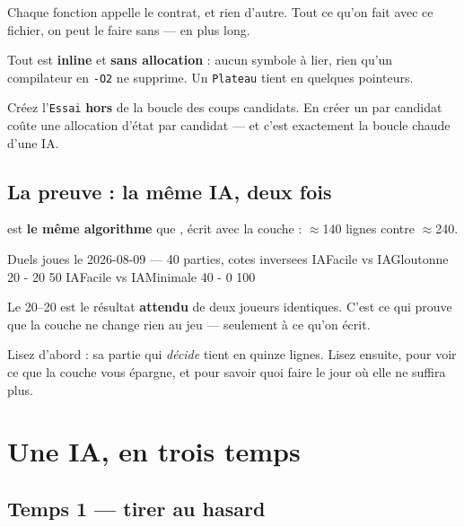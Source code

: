 \begin{nkretenir}
Chaque fonction appelle le contrat, et rien d'autre. Tout ce qu'on fait avec ce
fichier, on peut le faire sans — en plus long.

Tout est \textbf{inline} et \textbf{sans allocation} : aucun symbole à lier, rien
qu'un compilateur en \texttt{-O2} ne supprime. Un \texttt{Plateau} tient en
quelques pointeurs.
\end{nkretenir}

\begin{nkpiege}
Créez l'\texttt{Essai} \textbf{hors} de la boucle des coups candidats. En créer
un par candidat coûte une allocation d'état par candidat — et c'est exactement
la boucle chaude d'une IA.
\end{nkpiege}

\subsection{La preuve : la même IA, deux fois}

 est \textbf{le même algorithme} que
, écrit avec la couche : $\approx$140 lignes contre
$\approx$240.

\begin{nkcode}{Duels joues le 2026-08-09 — 40 parties, cotes inversees}
IAFacile   vs  IAGloutonne     20 - 20     50 %
IAFacile   vs  IAMinimale      40 -  0    100 %
\end{nkcode}

Le 20--20 est le résultat \textbf{attendu} de deux joueurs identiques. C'est ce
qui prouve que la couche ne change rien au jeu — seulement à ce qu'on écrit.

\begin{nkretenir}
Lisez  d'abord : sa partie qui \emph{décide} tient en quinze
lignes. Lisez  ensuite, pour voir ce que la couche vous
épargne, et pour savoir quoi faire le jour où elle ne suffira plus.
\end{nkretenir}

\section{Une IA, en trois temps}

\subsection{Temps 1 — tirer au hasard}

